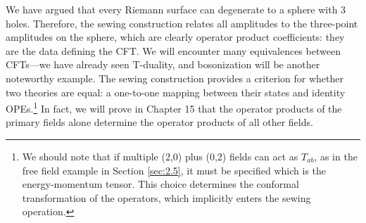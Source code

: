 We have argued that every Riemann surface can degenerate to a sphere with 3 holes. Therefore, the sewing construction relates all amplitudes to the three-point amplitudes on the sphere, which are clearly operator product coefficients: they are the data defining the CFT. 
We will encounter many equivalences between CFTs—we have already seen T-duality, and bosonization will be another noteworthy example.
The sewing construction provides a criterion for whether two theories are equal: 
a one-to-one mapping between their states and identity OPEs.\footnote{We should note that if multiple (2,0) plus (0,2) fields can act as $T_{ab}$, as in the free field example in Section \ref{sec:2.5}, it must be specified which is the energy-momentum tensor. This choice determines the conformal transformation of the operators, which implicitly enters the sewing operation.} In fact, we will prove in Chapter 15 that the operator products of the primary fields alone determine the operator products of all other fields. 

